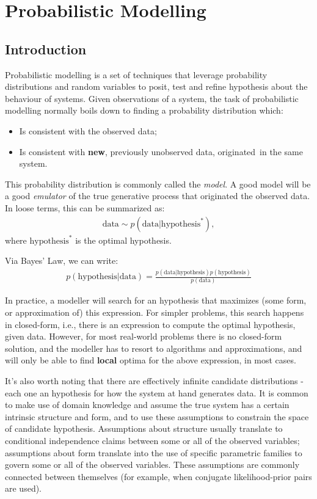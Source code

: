 \chapter{Probabilistic Modelling}
\label{chapter:probmodel}

\section{Introduction}
\label{section:probmodelintro}
Probabilistic modelling is a set of techniques that leverage probability
distributions and random variables to posit, test and refine hypothesis about
the behaviour of systems. Given observations of a system, the task of probabilistic
modelling normally boils down to finding a probability distribution which:
\begin{itemize}
    \item Is consistent with the observed data;
    \item Is consistent with \textbf{new}, previously unobserved data, originated\
        in the same system.
\end{itemize}

This probability distribution is commonly called the \emph{model}. A good model
will be a good \emph{emulator} of the true generative process that originated
the observed data. In loose terms, this can be summarized as:
\begin{align}
    \mbox{data} \sim p(\mbox{data}|\mbox{hypothesis}^*),
\end{align} where $\text{hypothesis}^*$ is the optimal hypothesis.

Via Bayes' Law, we can write:
\begin{align}
    p(\mbox{hypothesis}|\mbox{data}) = \frac{p(\mbox{data}|\mbox{hypothesis})p(\mbox{hypothesis})}{p(\mbox{data})}
\end{align}

In practice, a modeller will search for an hypothesis that maximizes (some form,
or approximation of) this expression. For simpler problems, this search happens
in closed-form, i.e., there is an expression to compute the optimal hypothesis,
given data. However, for most real-world problems there is no closed-form solution,
and the modeller has to resort to algorithms and approximations, and will only
be able to find \textbf{local} optima for the above expression, in most cases.

It's also worth noting that there are effectively infinite candidate distributions -
each one an hypothesis for how the system at hand generates data. It is common
to make use of domain knowledge and assume the true system has a certain intrinsic
structure and form, and to use these assumptions to constrain the space of
candidate hypothesis. Assumptions about structure usually translate to conditional
independence claims between some or all of the observed variables; assumptions
about form translate into the use of specific parametric families to govern some
or all of the observed variables. These assumptions are commonly connected between
themselves (for example, when conjugate likelihood-prior pairs are used).

